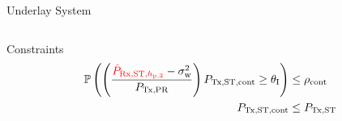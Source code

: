 \documentclass[16pt]{beamer}
\begin{document}
\begin{frame}[t]{Underlay System}
\begin{columns}
\begin{column}{0.62\columnwidth}
\begin{center}
\begin{overlayarea}{\textwidth}{4.6cm}
{{				}
			}
			\end{overlayarea}
			\end{center}
			{
				\begin{block}{\footnotesize Constraints}
				\vspace{-3.5mm}	
					\begin{align*}		
						\mathbb P\left( \left( \frac{{\color{red}{\hat{P}_{\text{Rx,ST,$h_{\text{p,3}}$}}}} - \sigma^2_{\text{w}}}{P_{\text{Tx,PR}}}\right) P_{\text{Tx,ST,cont}} \ge \theta_{\text{I}} \right) &\le \rho_{\text{cont}} \\ 
                                	P_{\text{Tx,ST,cont}} &\le P_{\text{Tx,ST}} 
                                \end{align*} 
               		 	\end{block}
			} 
		\end{column}
	\end{columns}
\end{frame}
\end{document}
